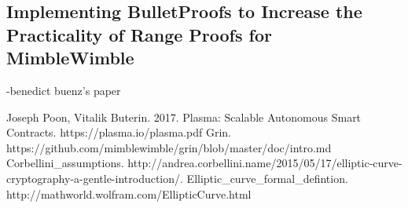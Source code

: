 \documentclass{amsart}
\theoremstyle{definition}
\numberwithin{equation}{section}
\begin{document}
\subsection{}



\subsection{Implementing BulletProofs to Increase the Practicality of Range Proofs for MimbleWimble}
-benedict buenz's paper



\begin{thebibliography}{9}
	Joseph Poon, Vitalik Buterin. 2017. Plasma: Scalable Autonomous Smart Contracts. 
	https://plasma.io/plasma.pdf
	Grin. https://github.com/mimblewimble/grin/blob/master/doc/intro.md
	Corbellini_assumptions. http://andrea.corbellini.name/2015/05/17/elliptic-curve-cryptography-a-gentle-introduction/.
	Elliptic_curve_formal_defintion. http://mathworld.wolfram.com/EllipticCurve.html

\end{thebibliography}
\end{document}
